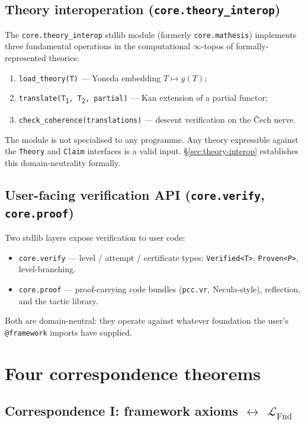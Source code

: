 \documentclass[11pt, a4paper]{article}
\theoremstyle{definition}
\theoremstyle{remark}
\newcommand{\LFnd}{\mathcal{L}_{\mathrm{Fnd}}}
\begin{document}
\subsection{Theory interoperation (\texttt{core.theory\_interop})}
\label{subsec:theory-interop-intro}

The \texttt{core.theory\_interop} stdlib module (formerly \texttt{core.mathesis}) implements three fundamental operations in the computational $\infty$-topos of formally-represented theories:
\begin{enumerate}[nosep]
\item \texttt{load\_theory(T)} --- Yoneda embedding $T \mapsto y(T)$;
\item \texttt{translate(T\textsubscript{1}, T\textsubscript{2}, partial)} --- Kan extension of a partial functor;
\item \texttt{check\_coherence(translations)} --- descent verification on the \v{C}ech nerve.
\end{enumerate}
The module is not specialised to any programme. Any theory expressible against the \texttt{Theory} and \texttt{Claim} interfaces is a valid input. \S\ref{sec:theory-interop} establishes this domain-neutrality formally.

\subsection{User-facing verification API (\texttt{core.verify}, \texttt{core.proof})}
\label{subsec:user-verify}

Two stdlib layers expose verification to user code:
\begin{itemize}[nosep]
\item \texttt{core.verify} --- level / attempt / certificate types; \texttt{Verified<T>}, \texttt{Proven<P>}, level-branching.
\item \texttt{core.proof} --- proof-carrying code bundles (\texttt{pcc.vr}, Necula-style), reflection, and the tactic library.
\end{itemize}
Both are domain-neutral: they operate against whatever foundation the user's \texttt{@framework} imports have supplied.

\section{Four correspondence theorems}
\label{sec:correspondences}

\subsection{Correspondence I: framework axioms $\leftrightarrow$ $\LFnd$}
\label{subsec:corr1}
\end{document}
